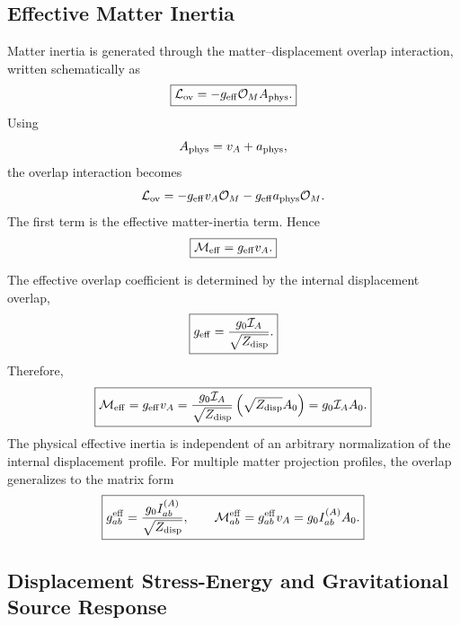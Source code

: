 \documentclass[11pt]{article}
\begin{document}
\subsection{Effective Matter Inertia}

Matter inertia is generated through the matter--displacement overlap interaction,
written schematically as
\begin{equation}
\boxed{
\mathcal L_{\rm ov}
=
-g_{\rm eff}\mathcal O_MA_{\rm phys}.
}
\end{equation}
Using
\begin{equation}
A_{\rm phys}=v_A+a_{\rm phys},
\end{equation}
the overlap interaction becomes
\begin{equation}
\mathcal L_{\rm ov}
=
-g_{\rm eff}v_A\mathcal O_M
-
g_{\rm eff}a_{\rm phys}\mathcal O_M.
\end{equation}
The first term is the effective matter-inertia term. Hence
\begin{equation}
\boxed{
\mathcal M_{\rm eff}
=
g_{\rm eff}v_A.
}
\end{equation}

The effective overlap coefficient is determined by the internal displacement
overlap,
\begin{equation}
\boxed{
g_{\rm eff}
=
\frac{g_0\mathcal I_A}{\sqrt{Z_{\rm disp}}}.
}
\end{equation}
Therefore,
\begin{equation}
\boxed{
\mathcal M_{\rm eff}
=
g_{\rm eff}v_A
=
\frac{g_0\mathcal I_A}{\sqrt{Z_{\rm disp}}}
\left(
\sqrt{Z_{\rm disp}}A_0
\right)
=
g_0\mathcal I_AA_0.
}
\end{equation}
The physical effective inertia is independent of an arbitrary normalization of
the internal displacement profile. For multiple matter projection profiles, the overlap generalizes to the matrix
form
\begin{equation}
\boxed{
g_{ab}^{\rm eff}
=
\frac{g_0I_{ab}^{(A)}}{\sqrt{Z_{\rm disp}}},
\qquad
\mathcal M_{ab}^{\rm eff}
=
g_{ab}^{\rm eff}v_A
=
g_0I_{ab}^{(A)}A_0.
}
\end{equation}

\subsection{Displacement Stress-Energy and Gravitational Source Response}
\end{document}
